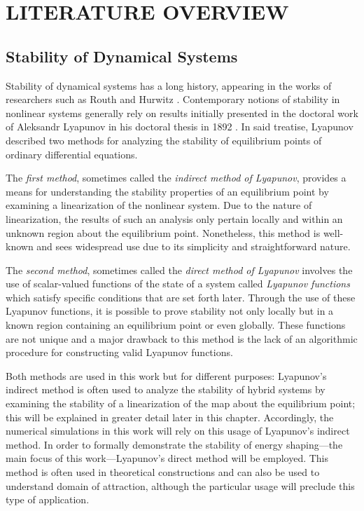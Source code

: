 \chapter{\uppercase{Literature Overview}}

\section{Stability of Dynamical Systems}

Stability of dynamical systems has a long history, appearing in the works of
researchers such as Routh \cite{Routh1877} and Hurwitz \cite{Hurwitz1895}.
%
Contemporary notions of stability in nonlinear systems generally rely on results
initially presented in the doctoral work of Aleksandr Lyapunov in his doctoral
thesis in 1892 \cite{Lyapunov1992}.
%
In said treatise, Lyapunov described two methods for analyzing the stability of
equilibrium points of ordinary differential equations.

The {\em first method}, sometimes called the {\em indirect method of Lyapunov},
provides a means for understanding the stability properties of an equilibrium
point by examining a linearization of the nonlinear system.
%
Due to the nature of linearization, the results of such an analysis only pertain
locally and within an unknown region about the equilibrium point.
%
Nonetheless, this method is well-known and sees widespread use due to its
simplicity and straightforward nature.
%

The {\em second method}, sometimes called the {\em direct method of Lyapunov}
involves the use of scalar-valued functions of the state of a system called {\em
  Lyapunov functions} which satisfy specific conditions that are set forth
later.
%
Through the use of these Lyapunov functions, it is possible to prove
stability not only locally but in a known region containing an equilibrium point
or even globally.
%
These functions are not unique and a major drawback to this method is the lack
of an algorithmic procedure for constructing valid Lyapunov functions.

Both methods are used in this work but for different purposes:
%
Lyapunov's indirect method is often used to analyze the stability of hybrid
systems by examining the stability of a linearization of the \Poincare{} map
about the equilibrium point; this will be explained in greater detail later in
this chapter.
%
Accordingly, the numerical simulations in this work will rely on this usage of
Lyapunov's indirect method.
%
In order to formally demonstrate the stability of energy shaping---the main
focus of this work---Lyapunov's direct method will be employed.
%
This method is often used in theoretical constructions and can also be used to
understand domain of attraction, although the particular usage will preclude
this type of application.

